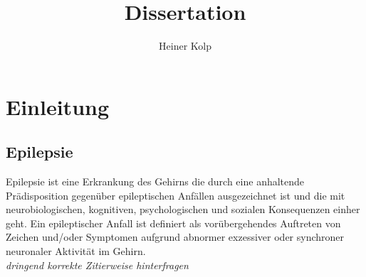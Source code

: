 \documentclass[a4paper,11pt]{report}
\title{Dissertation}
\author{Heiner Kolp}
\begin{document}
\setlength{\parindent}{0pt}
\maketitle
\tableofcontents

\chapter{Einleitung}

\section{Epilepsie}
Epilepsie ist eine Erkrankung des Gehirns die durch eine anhaltende Prädisposition gegenüber epileptischen Anfällen ausgezeichnet ist und die mit neurobiologischen, kognitiven, psychologischen und sozialen Konsequenzen einher geht. Ein epileptischer Anfall ist definiert als vorübergehendes Auftreten von Zeichen und/oder Symptomen aufgrund abnormer exzessiver oder synchroner neuronaler Aktivität im Gehirn.\cite{Fisher.2005}\\
\textit{dringend korrekte Zitierweise hinterfragen}\\
\end{document}
